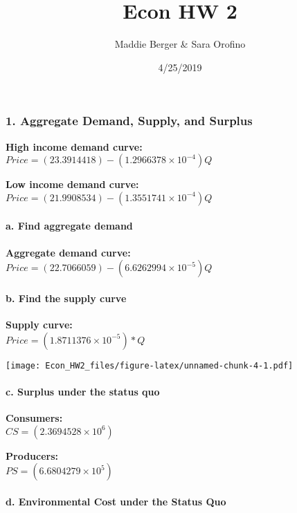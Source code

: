 \documentclass[]{article}
\title{Econ HW 2}
\author{Maddie Berger \& Sara Orofino}
\date{4/25/2019}
\let\oldparagraph\paragraph
\renewcommand{\paragraph}[1]{\oldparagraph{#1}\mbox{}}
\begin{document}
\maketitle

\subsubsection{1. Aggregate Demand, Supply, and
Surplus}\label{aggregate-demand-supply-and-surplus}

\textbf{High income demand curve:}\\
\(Price = (23.3914418) - (1.2966378\times 10^{-4})Q\)

\textbf{Low income demand curve:}\\
\(Price = (21.9908534) - (1.3551741\times 10^{-4})Q\)

\paragraph{a. Find aggregate demand}\label{a.-find-aggregate-demand}

\textbf{Aggregate demand curve:}\\
\(Price = (22.7066059) - (6.6262994\times 10^{-5})Q\)

\paragraph{b. Find the supply curve}\label{b.-find-the-supply-curve}

\textbf{Supply curve:}\\
\(Price = (1.8711376\times 10^{-5})*Q\)

\texttt{[image: Econ\_HW2\_files/figure-latex/unnamed-chunk-4-1.pdf]}

\paragraph{c. Surplus under the status
quo}\label{c.-surplus-under-the-status-quo}

\textbf{Consumers:}\\
\(CS = (2.3694528\times 10^{6})\)

\textbf{Producers:}\\
\(PS = (6.6804279\times 10^{5})\)

\paragraph{d. Environmental Cost under the Status
Quo}\label{d.-environmental-cost-under-the-status-quo}
\end{document}

